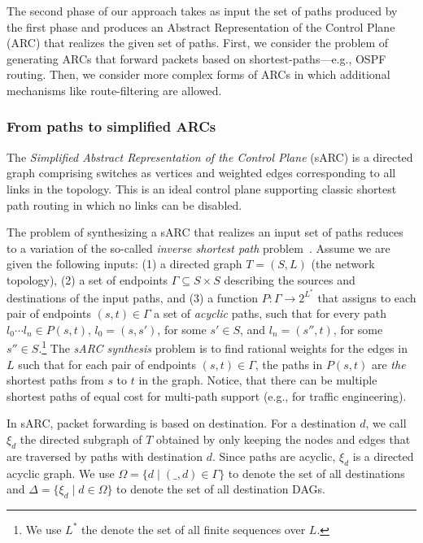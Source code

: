 The second phase of our approach takes as input the set of paths produced by the first phase
and produces an Abstract Representation of the Control Plane (ARC) that realizes the given set of paths.
First, we consider the problem of generating ARCs that
 forward packets based on shortest-paths---e.g., OSPF routing.
Then, we consider more complex forms of ARCs in which 
 additional mechanisms like route-filtering are allowed. 
 
\subsubsection{From paths to simplified ARCs} \label{sec:sarc}
The \emph{Simplified Abstract Representation of the Control Plane} (sARC) is a directed graph comprising switches as 
vertices and weighted edges corresponding to all links in the
topology. 
This is an ideal control plane supporting classic shortest path routing in which no links can be disabled. 

The problem of synthesizing 
a sARC that realizes an input set of paths reduces to a
variation of the so-called {\em inverse shortest path} problem~\cite{isp}. 
Assume we are given the following inputs: (1) a directed graph $T = (S, L)$ (the network topology), 
(2) a set of endpoints $\Gamma \subseteq S\times S$
describing the sources and destinations of the input paths, and 
(3) a function $P: \Gamma \rightarrow 2^{L^*}$
that assigns to each pair of endpoints $(s,t) \in \Gamma$ 
a set of \emph{acyclic} paths, such that for every path $l_0\cdots l_n\in P(s,t)$,
$l_0=(s,s')$, for some $s'\in S$, and $l_n=(s'',t)$, for some $s''\in S$.\footnote{
We use $L^*$ the denote the set of all finite sequences over $L$.}
The 
\emph{sARC synthesis}
problem is to find rational weights for the edges in $L$ such that 
for each pair of endpoints $(s,t) \in \Gamma$, 
the paths in $P(s,t)$ are \emph{the} shortest paths from $s$ to $t$ 
in the graph. Notice, that there can be multiple shortest
paths of equal cost for multi-path support (e.g., for traffic engineering).

In sARC, packet forwarding is based on destination.
For a destination $d$, we call $\xi_d$ the directed
subgraph of $T$ obtained by only keeping the nodes and edges 
that are traversed by paths with destination $d$.
Since paths are acyclic, $\xi_d$ is a directed acyclic graph.
We use $\Omega=\{d\mid (\_,d)\in\Gamma\}$ to denote the 
set of all destinations and $\Delta=\{\xi_d\mid d\in \Omega\}$ to denote  
the set of all destination DAGs. 

